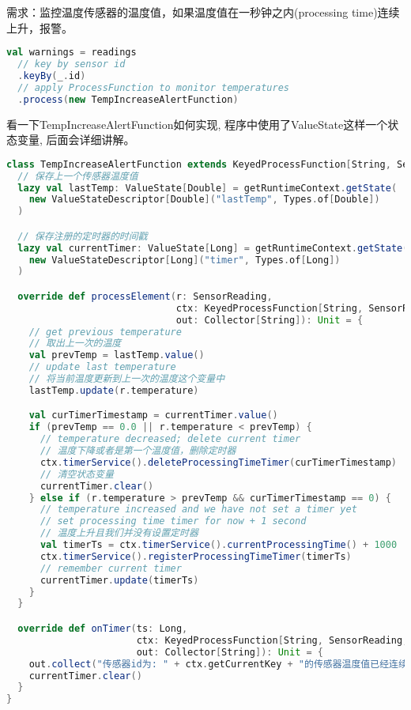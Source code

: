 \documentclass[oneside]{ctexbook}
\begin{document}
需求：监控温度传感器的温度值，如果温度值在一秒钟之内(processing time)连续上升，报警。

\begin{lstlisting}[language=scala]
val warnings = readings
  // key by sensor id
  .keyBy(_.id)
  // apply ProcessFunction to monitor temperatures
  .process(new TempIncreaseAlertFunction)
\end{lstlisting}

看一下TempIncreaseAlertFunction如何实现, 程序中使用了ValueState这样一个状态变量, 后面会详细讲解。

\begin{lstlisting}[language=scala]
class TempIncreaseAlertFunction extends KeyedProcessFunction[String, SensorReading, String] {
  // 保存上一个传感器温度值
  lazy val lastTemp: ValueState[Double] = getRuntimeContext.getState(
    new ValueStateDescriptor[Double]("lastTemp", Types.of[Double])
  )

  // 保存注册的定时器的时间戳
  lazy val currentTimer: ValueState[Long] = getRuntimeContext.getState(
    new ValueStateDescriptor[Long]("timer", Types.of[Long])
  )

  override def processElement(r: SensorReading,
                              ctx: KeyedProcessFunction[String, SensorReading, String]#Context,
                              out: Collector[String]): Unit = {
    // get previous temperature
    // 取出上一次的温度
    val prevTemp = lastTemp.value()
    // update last temperature
    // 将当前温度更新到上一次的温度这个变量中
    lastTemp.update(r.temperature)

    val curTimerTimestamp = currentTimer.value()
    if (prevTemp == 0.0 || r.temperature < prevTemp) {
      // temperature decreased; delete current timer
      // 温度下降或者是第一个温度值，删除定时器
      ctx.timerService().deleteProcessingTimeTimer(curTimerTimestamp)
      // 清空状态变量
      currentTimer.clear()
    } else if (r.temperature > prevTemp && curTimerTimestamp == 0) {
      // temperature increased and we have not set a timer yet
      // set processing time timer for now + 1 second
      // 温度上升且我们并没有设置定时器
      val timerTs = ctx.timerService().currentProcessingTime() + 1000
      ctx.timerService().registerProcessingTimeTimer(timerTs)
      // remember current timer
      currentTimer.update(timerTs)
    }
  }

  override def onTimer(ts: Long,
                       ctx: KeyedProcessFunction[String, SensorReading, String]#OnTimerContext,
                       out: Collector[String]): Unit = {
    out.collect("传感器id为: " + ctx.getCurrentKey + "的传感器温度值已经连续1s上升了。")
    currentTimer.clear()
  }
}
\end{lstlisting}
\end{document}
